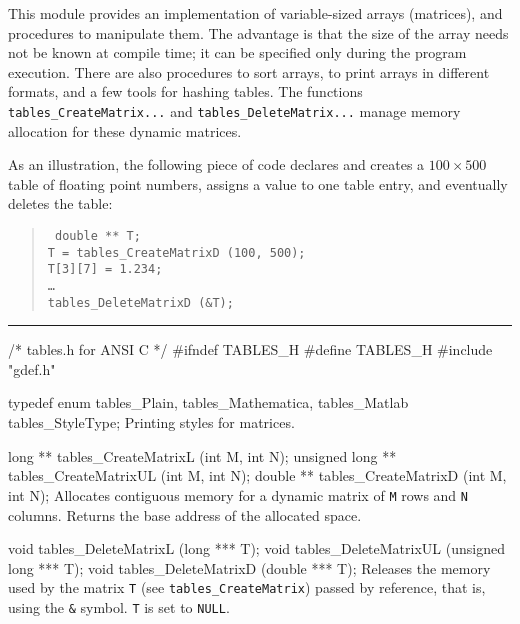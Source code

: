 
This module provides an implementation of variable-sized arrays (matrices),
and procedures to manipulate them.
The advantage is that the size of the array needs not be known
at compile time; it can be specified only during the program execution.
There are also procedures to sort arrays,  to
print  arrays in different formats,
and a few tools for hashing tables.
The functions {\tt tables\_CreateMatrix...} and
{\tt tables\_DeleteMatrix...} manage memory allocation for
these dynamic matrices.

As an illustration, the following piece of code declares and creates
a $100\times 500$ table of floating point numbers, assigns a value
to one table entry, and eventually deletes the table:
  \begin{verse}{\tt
    double ** T;\\
    T = tables\_CreateMatrixD (100, 500);\\
    T[3][7] = 1.234;\\
    \dots \\
    tables\_DeleteMatrixD (\&T);
  }\end{verse}

\bigskip\hrule
\code\hide
/* tables.h for ANSI C */
#ifndef TABLES_H
#define TABLES_H
\endhide
#include "gdef.h"
\endcode

\code

typedef enum {
   tables_Plain,
   tables_Mathematica,
   tables_Matlab
   } tables_StyleType;
\endcode
  \tab Printing styles for matrices.
  \endtab

\code

long ** tables_CreateMatrixL  (int M, int N);
unsigned long ** tables_CreateMatrixUL (int M, int N);
double ** tables_CreateMatrixD  (int M, int N);
\endcode
  \tab Allocates contiguous memory for a dynamic 
  matrix of {\tt M} rows and {\tt N} columns. Returns the base
  address of the allocated space.
  \endtab
\code


void tables_DeleteMatrixL  (long *** T);
void tables_DeleteMatrixUL (unsigned long *** T);
void tables_DeleteMatrixD  (double *** T);
\endcode
  \tab Releases the memory used by the matrix {\tt T}
  (see {\tt tables\_CreateMatrix}) passed by
  reference, that is, using the {\tt \&} symbol. 
  {\tt T} is set to {\tt NULL}.
  \endtab
\code


